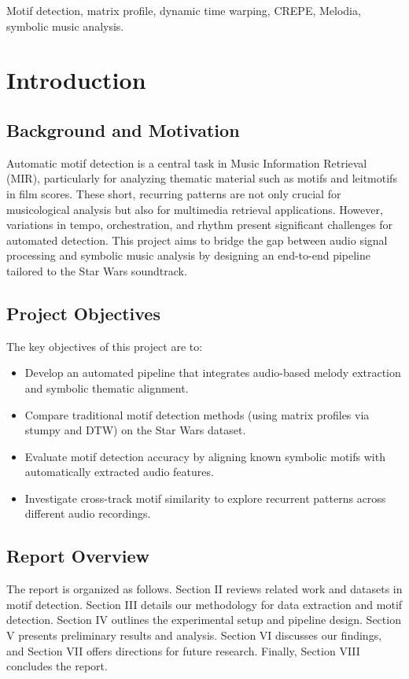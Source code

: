 \documentclass[conference]{IEEEtran}
\begin{document}
\begin{IEEEkeywords}
Motif detection, matrix profile, dynamic time warping, CREPE, Melodia, symbolic music analysis.
\end{IEEEkeywords}

\section{Introduction}

\subsection{Background and Motivation}
Automatic motif detection is a central task in Music Information Retrieval (MIR), particularly for analyzing thematic material such as motifs and leitmotifs in film scores. These short, recurring patterns are not only crucial for musicological analysis but also for multimedia retrieval applications. However, variations in tempo, orchestration, and rhythm present significant challenges for automated detection. This project aims to bridge the gap between audio signal processing and symbolic music analysis by designing an end-to-end pipeline tailored to the Star Wars soundtrack.

\subsection{Project Objectives}
The key objectives of this project are to:
\begin{itemize}
    \item Develop an automated pipeline that integrates audio-based melody extraction and symbolic thematic alignment.
    \item Compare traditional motif detection methods (using matrix profiles via stumpy\cite{law2019stumpy} and DTW) on the Star Wars dataset.
    \item Evaluate motif detection accuracy by aligning known symbolic motifs with automatically extracted audio features.
    \item Investigate cross-track motif similarity to explore recurrent patterns across different audio recordings.
\end{itemize}

\subsection{Report Overview}
The report is organized as follows. Section II reviews related work and datasets in motif detection. Section III details our methodology for data extraction and motif detection. Section IV outlines the experimental setup and pipeline design. Section V presents preliminary results and analysis. Section VI discusses our findings, and Section VII offers directions for future research. Finally, Section VIII concludes the report.
\end{document}
